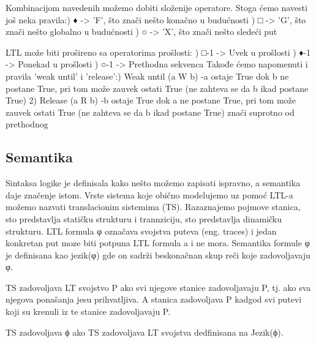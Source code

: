 \documentclass[a4paper]{article}
\begin{document}
{	Kombinacijom navedenih možemo dobiti složenije operatore. Stoga ćemo navesti još neka pravila:\newline {}) ♦ -> 'F', što znači nešto konačno u budućnosti ) □ -> 'G', što znači nešto globalno u budućnosti ) ○ -> 'X', što znači nešto sledeći put \newline

	LTL može biti prošireno sa operatorima prošlosti: \newline {}) □-1 -> Uvek u prošlosti ) ♦-1 -> Ponekad u prošlosti ) ○-1 -> Prethodna sekvenca \newline\newline
		Takođe ćemo napomenuti i pravila 'weak until' i 'release':) Weak until (a W b) \newline
		-a ostaje True dok b ne postane True, pri tom može zauvek ostati True (ne zahteva se da b ikad postane True)
	2) Release (a R b) \newline
		-b ostaje True dok a ne postane True, pri tom može zauvek ostati True (ne zahteva se da b ikad postane True) znači suprotno od prethodnog \newline

	\subsection{Semantika}
	\label{subsec:podnaslovN}
	\newline
	Sintaksa logike je definisala kako nešto možemo zapisati ispravno, a semantika daje značenje istom.
	Vrste sistema koje obično modelujemo uz pomoć LTL-a možemo nazvati translacionim sistemima (TS). Razaznajemo pojmove stanica, sto predstavlja statičku strukturu i trannziciju, sto predstavlja dinamičku strukturu.
	LTL formula φ označava svojstva puteva (eng. traces) i jedan konkretan put moze biti potpuna LTL formula a i ne mora.
	Semantika formule φ je definisana kao jezik(φ) gde on sadrži beskonačnan skup reči koje zadovoljavaju φ.

	TS zadovoljava LT svojstvo P ako svi njegove stanice zadovoljavaju P, tj. ako sva njegova ponašanja jesu prihvatljiva. A stanica zadovoljava P kadgod svi putevi koji su krenuli iz te stanice zadovoljavaju P.

	TS zadovoljava ϕ ako TS zadovoljava LT svojstva dedfinisana na Jezik(ϕ).
	}
\end{document}
